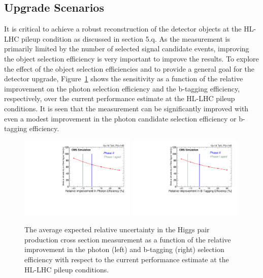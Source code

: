 \subsection{Upgrade Scenarios}
\label{sec:scenarios}

It is critical to achieve a robust reconstruction of the detector objects at the HL-LHC pileup condition as discussed in section 5.q. As the measurement is primarily limited by the number of selected signal candidate events, improving the object selection efficiency is very important to improve the results. To explore the effect of the object selection efficiencies and to provide a general goal for the detector upgrade, Figure~\ref{fig:PhotonEffImprovementScan} shows the sensitivity as a function of the relative improvement on the photon selection efficiency and the b-tagging efficiency, respectively, over the current performance estimate at the HL-LHC pileup conditions. It is seen that the measurement can be significantly improved with even a modest improvement in the photon candidate selection efficiency or b-tagging efficiency. 

\begin{figure}[h]
  \centering
  \includegraphics[width=0.49\textwidth]{figures_chapter6/XSUncertaintyVsPhotonEffRatio.pdf}
  \includegraphics[width=0.49\textwidth]{figures_chapter6/XSUncertaintyVsBtagEffRatio.pdf}
  \caption{ The average expected relative uncertainty in the Higgs pair production cross section measurement as a function of the relative improvement in the photon (left) and b-tagging (right) selection efficiency with respect to the current performance estimate at the HL-LHC pileup conditions.}
  \label{fig:PhotonEffImprovementScan}
\end{figure}



